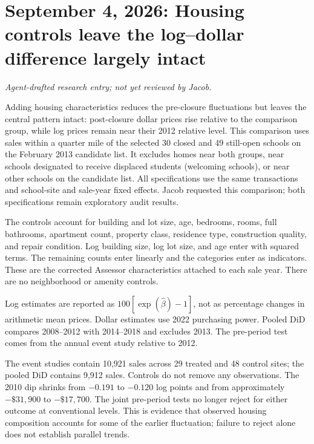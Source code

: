 \section*{September 4, 2026: Housing controls leave the log--dollar difference largely intact}
\textit{Agent-drafted research entry; not yet reviewed by Jacob.}

Adding housing characteristics reduces the pre-closure fluctuations but leaves
the central pattern intact: post-closure dollar prices rise relative to the
comparison group, while log prices remain near their 2012 relative level.
This comparison uses sales within a quarter mile of the selected 30 closed
and 49 still-open schools on the February 2013 candidate list. It excludes
homes near both groups, near schools designated to receive displaced
students (welcoming schools), or near other schools on the candidate list. All
specifications use the
same transactions and school-site and sale-year fixed effects. Jacob requested
this comparison; both specifications remain exploratory audit results.

The controls account for building and lot size, age, bedrooms, rooms, full
bathrooms, apartment count, property class, residence type, construction
quality, and repair condition. Log building size, log lot size, and age enter
with squared terms. The remaining counts enter linearly and the categories
enter as indicators. These are the corrected Assessor characteristics attached
to each sale year. There are no neighborhood or amenity controls.

\begin{center}
\small

\end{center}
{\footnotesize Log estimates are reported as $100[\exp(\hat\beta)-1]$, not as
percentage changes in arithmetic mean prices. Dollar estimates use 2022
purchasing power. Pooled DiD compares 2008--2012 with 2014--2018 and excludes
2013. The pre-period test comes from the annual event study relative to 2012.}

The event studies contain 10,921 sales across 29 treated and 48 control sites;
the pooled DiD contains 9,912 sales. Controls do not remove any observations.
The 2010 dip shrinks from $-0.191$ to $-0.120$ log points and from approximately
$-\$31,900$ to $-\$17,700$. The joint pre-period tests no longer reject for
either outcome at conventional levels. This is evidence that observed housing
composition accounts for some of the earlier fluctuation; failure to reject
alone does not establish parallel trends.

